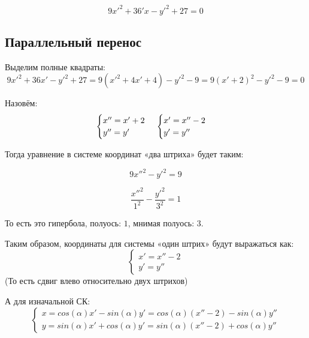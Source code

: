 \documentclass[12pt, a4paper]{article}
\begin{document}
    \begin{equation}
        9x'^2 + 36'x - y'^2 + 27 = 0
    \end{equation}

    \subsection{Параллельный перенос}

    Выделим полные квадраты:
    \begin{equation}
        9x'^2 + 36x' - y'^2 + 27 = 9(x'^2 + 4x' + 4) - y'^2 - 9 = 9(x' + 2)^2 - y'^2 - 9 = 0
    \end{equation}
    
    Назовём:
    \begin{equation}
        \begin{cases}
            x'' = x' + 2 \\
            y'' = y'
        \end{cases} \\
        \begin{cases}
            x' = x'' - 2 \\
            y' = y''
        \end{cases}
    \end{equation}
    
    Тогда уравнение в системе координат «два штриха» будет таким:
    
    \begin{equation}
        9x''^2 - y'^2 = 9
    \end{equation}

    \begin{equation}
        \frac{x''^2}{1^2} - \frac{y'^2}{3^2} = 1
    \end{equation}

    То есть это гипербола, полуось: $1$, мнимая полуось: $3$.

    Таким образом, координаты для системы «один штрих» будут выражаться как:
    \begin{equation}
        \begin{cases}
            x' = x'' - 2 \\
            y' = y''
        \end{cases}
    \end{equation}
    (То есть сдвиг влево относительно двух штрихов)

    А для изначальной СК:
    \begin{equation}
        \begin{cases}
            x = cos(\alpha) x' - sin(\alpha) y' = cos(\alpha) (x'' - 2) - sin(\alpha) y'' \\
            y = sin(\alpha) x' + cos(\alpha) y' = sin(\alpha) (x'' - 2) + cos(\alpha) y''
        \end{cases}
    \end{equation}
\end{document}
